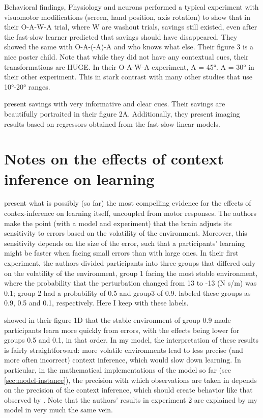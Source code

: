 \documentclass{report}
\begin{document}
\begin{chapter}{Behavioral findings, Physiology and neurons}
\cite{Zarahn_Explaining_2008} performed a typical experiment with visuomotor
modifications (screen, hand position, axis rotation) to show that in their
O-A-W-A trial, where W are washout trials, savings still existed, even after
the fast-slow learner predicted that savings should have disappeared. They
showed the same with O-A-(-A)-A and who knows what else. Their figure 3 is a
nice poster child. Note that while they did not have any contextual cues, their
transformations are HUGE. In their O-A-W-A experiment, A = 45°. A = 30° in their
other experiment. This in stark contrast with many other studies that use
10°-20° ranges.

\cite{Kim_Neural_2015} present savings with very informative and clear
cues. Their savings are beautifully portraited in their figure
2A. Additionally, they present imaging results based on regressors obtained
from the fast-slow linear models.

\section{Notes on the effects of context inference on learning}

\cite{Herzfeld_memory_2014} present what is possibly (so far) the most
compelling evidence for the effects of contex-inference on learning itself,
uncoupled from motor responses. The authors make the point (with a model and
experiment) that the brain adjusts its sensitivity to errors based on the
volatility of the environment. Moreover, this sensitivity depends on the size
of the error, such that a participants' learning might be faster when facing
small errors than with large ones. In their first experiment, the authors
divided participants into three groups that differed only on the volatility of
the environment, group 1 facing the most stable environment, where the
probability that the perturbation changed from 13 to -13 (N s/m) was 0.1; group
2 had a probability of 0.5 and group3 of 0.9. \cite{Herzfeld_memory_2014}
labeled these groups as 0.9, 0.5 and 0.1, respectively. Here I keep with these
labels.

\cite{Herzfeld_memory_2014} showed in their figure 1D that the stable
environment of group 0.9 made participants learn more quickly from errors, with
the effects being lower for groups 0.5 and 0.1, in that order. In my model, the
interpretation of these results is fairly straightforward: more volatile
environments lead to less precise (and more often incorrect) context inference,
which would slow down learning. In particular, in the mathematical
implementations of the model so far (see \ref{sec:model-instance}), the
precision with which observations are taken in depends on the precision of the
context inference, which should create behavior like that observed by
\cite{Herzfeld_memory_2014}. Note that the authors' results in experiment 2 are
explained by my model in very much the same vein.


\end{chapter}
\end{document}
